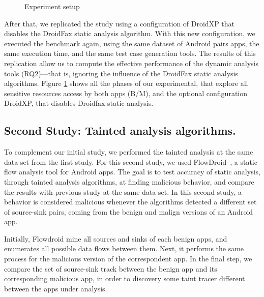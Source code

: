 \begin{figure}[ht]
   \label{Experiment setup}
   \caption{Experiment setup}
   \label{fig:setup}
 \end{figure}

After that, we replicated the study using a configuration of DroidXP that disables the DroidFax static analysis algorithm. With this new configuration, we executed the benchmark again, using the same dataset of Android pairs apps, the same execution time, and the same test case generation tools.
The results of this replication allow us to compute the effective performance
of the dynamic analysis tools (RQ2)---that is, ignoring the influence of the
DroidFax static analysis algorithms. Figure \ref{fig:setup} shows all the phases of our experimental, that explore all sensitive resources access by both apps (B/M), and the optional configuration DroidXP, that disables Droidfax static analysis.

\subsection{Second Study: Tainted analysis algorithms.}

To complement our initial study, we performed the tainted analysis at the same
data set from the first study. For this second study, we used
FlowDroid~\cite{DBLP:conf/pldi/ArztRFBBKTOM14}, a static flow analysis tool for Android apps.
The goal is to test accuracy of static analysis, through tainted analysis algorithms, at finding malicious behavior, and compare the results with previous study at the same data set.
In this second study, a behavior is considered malicious whenever the algorithms
detected a different set of source-sink pairs, coming from the benign and malign
versions of an Android app. 

Initially, Flowdroid mine all sources and sinks of each benign apps, and enumerates all possible data flows between them. Next, it performs the same process for the malicious version
of the correspondent app. In the final step, we compare the set of source-sink track between the benign app and its corresponding malicious app, in order to discovery some taint tracer different between the apps under analysis.

